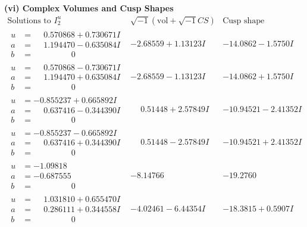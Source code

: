 \documentclass[1p]{elsarticle_modified}
\theoremstyle{definition}
\newcommand{\I}{\sqrt{-1}}
\begin{document}
\newpage\flushleft \textbf{(vi) Complex Volumes and Cusp Shapes}
$$\begin{array}{c|c|c}  
\text{Solutions to }I^u_{2}& \I (\text{vol} + \sqrt{-1}CS) & \text{Cusp shape}\\
 \hline 
\begin{aligned}
u &= \phantom{-}0.570868 + 0.730671 I \\
a &= \phantom{-}1.194470 - 0.635084 I \\
b &= \phantom{-0.000000 } 0\end{aligned}
 & -2.68559 + 1.13123 I & -14.0862 - 1.5750 I \\ \hline\begin{aligned}
u &= \phantom{-}0.570868 - 0.730671 I \\
a &= \phantom{-}1.194470 + 0.635084 I \\
b &= \phantom{-0.000000 } 0\end{aligned}
 & -2.68559 - 1.13123 I & -14.0862 + 1.5750 I \\ \hline\begin{aligned}
u &= -0.855237 + 0.665892 I \\
a &= \phantom{-}0.637416 - 0.344390 I \\
b &= \phantom{-0.000000 } 0\end{aligned}
 & \phantom{-}0.51448 + 2.57849 I & -10.94521 - 2.41352 I \\ \hline\begin{aligned}
u &= -0.855237 - 0.665892 I \\
a &= \phantom{-}0.637416 + 0.344390 I \\
b &= \phantom{-0.000000 } 0\end{aligned}
 & \phantom{-}0.51448 - 2.57849 I & -10.94521 + 2.41352 I \\ \hline\begin{aligned}
u &= -1.09818\phantom{ +0.000000I} \\
a &= -0.687555\phantom{ +0.000000I} \\
b &= \phantom{-0.000000 } 0\end{aligned}
 & -8.14766\phantom{ +0.000000I} & -19.2760\phantom{ +0.000000I} \\ \hline\begin{aligned}
u &= \phantom{-}1.031810 + 0.655470 I \\
a &= \phantom{-}0.286111 + 0.344558 I \\
b &= \phantom{-0.000000 } 0\end{aligned}
 & -4.02461 - 6.44354 I & -18.3815 + 0.5907 I \\ \hline\begin{aligned}

\end{aligned}
\end{array}$$
\end{document}
